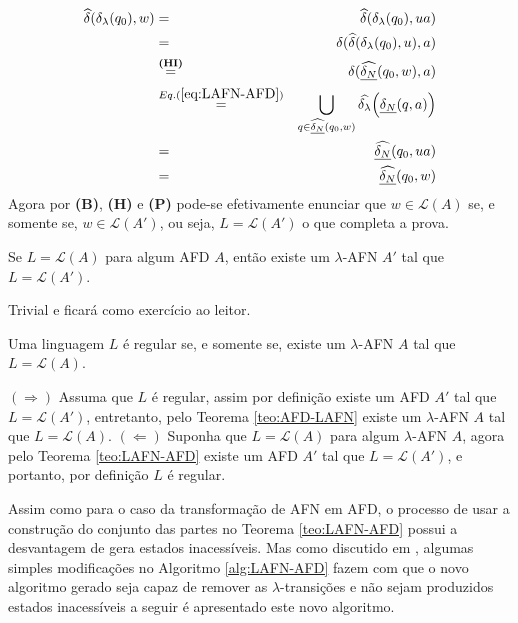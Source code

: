 \begin{prova}
\begin{itemize}
		\begin{eqnarray*}
			\widehat{\delta}(\delta_\lambda(q_0), w) & = & \widehat{\delta}(\delta_\lambda(q_0), ua)\\
			& = & \delta(\widehat{\delta}(\delta_\lambda(q_0), u), a)\\
			& \stackrel{\textbf{(HI)}}{=} & \delta(\widehat{\underline{\delta_N}}(q_0, w), a)\\
			& \stackrel{Eq. (\ref{eq:LAFN-AFD})}{=} & \bigcup_{q \in \widehat{\underline{\delta_N}}(q_0, w)} \widehat{\delta_\lambda}\Big(\underline{\delta_N}(q, a)\Big)\\
			& = & \widehat{\underline{\delta_N}}(q_0, ua)\\
			& = & \widehat{\underline{\delta_N}}(q_0, w)
		\end{eqnarray*}
    Agora por  \textbf{(B)}, \textbf{(H)} e \textbf{(P)} pode-se efetivamente enunciar que $w \in \mathcal{L}(A)$ se, e somente se, $w \in \mathcal{L}(A')$, ou seja, $L = \mathcal{L}(A')$ o que completa a prova.
  \end{itemize}
\end{prova}

\begin{teorema}\label{teo:AFD-LAFN}
	Se $L = \mathcal{L}(A)$ para algum AFD $A$, então existe um $\lambda$-AFN $A'$ tal que $L = \mathcal{L}(A')$.
\end{teorema}

\begin{prova}
	Trivial e ficará como exercício ao leitor.
\end{prova}

\begin{corolario}\label{col:RegularLAFN}
	Uma linguagem $L$ é regular se, e somente se, existe um $\lambda$-AFN $A$ tal que $L = \mathcal{L}(A)$.
\end{corolario}

\begin{prova}
	$(\Rightarrow)$ Assuma que $L$ é regular, assim por definição existe um AFD $A'$ tal que $L = \mathcal{L}(A')$, entretanto, pelo Teorema \ref{teo:AFD-LAFN} existe um $\lambda$-AFN $A$ tal que $L = \mathcal{L}(A)$. $(\Leftarrow)$ Suponha que $L = \mathcal{L}(A)$ para algum $\lambda$-AFN $A$, agora pelo Teorema \ref{teo:LAFN-AFD} existe um AFD $A'$ tal que $L = \mathcal{L}(A')$, e portanto, por definição $L$ é regular.
\end{prova}

Assim como para o caso da transformação de AFN em AFD, o processo de usar a construção do conjunto das partes no Teorema \ref{teo:LAFN-AFD} possui a desvantagem de gera estados inacessíveis. Mas como discutido em \cite{benja-2011, benja-2015, hopcroft2008, linz2006}, algumas simples modificações no Algoritmo \ref{alg:LAFN-AFD} fazem com que o novo algoritmo gerado seja capaz de remover as $\lambda$-transições e não sejam produzidos estados inacessíveis a seguir é apresentado este novo algoritmo.

